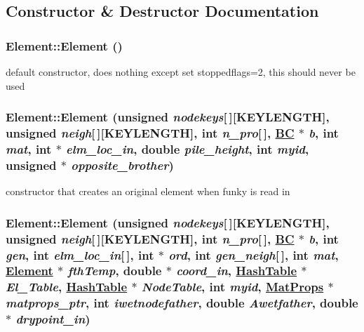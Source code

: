 \subsection{Constructor \& Destructor Documentation}
\hypertarget{classElement_a0}{
\subsubsection[Element]{\setlength{\rightskip}{0pt plus 5cm}Element::Element ()}}
\label{classElement_a0}


default constructor, does nothing except set stoppedflags=2, this should never be used 

\hypertarget{classElement_a1}{
\subsubsection[Element]{\setlength{\rightskip}{0pt plus 5cm}Element::Element (unsigned {\em nodekeys}\mbox{[}$\,$\mbox{]}\mbox{[}KEYLENGTH\mbox{]}, unsigned {\em neigh}\mbox{[}$\,$\mbox{]}\mbox{[}KEYLENGTH\mbox{]}, int {\em n\_\-pro}\mbox{[}$\,$\mbox{]}, \hyperlink{structBC}{BC} $\ast$ {\em b}, int {\em mat}, int $\ast$ {\em elm\_\-loc\_\-in}, double {\em pile\_\-height}, int {\em myid}, unsigned $\ast$ {\em opposite\_\-brother})}}
\label{classElement_a1}


constructor that creates an original element when funky is read in 

\hypertarget{classElement_a2}{
\subsubsection[Element]{\setlength{\rightskip}{0pt plus 5cm}Element::Element (unsigned {\em nodekeys}\mbox{[}$\,$\mbox{]}\mbox{[}KEYLENGTH\mbox{]}, unsigned {\em neigh}\mbox{[}$\,$\mbox{]}\mbox{[}KEYLENGTH\mbox{]}, int {\em n\_\-pro}\mbox{[}$\,$\mbox{]}, \hyperlink{structBC}{BC} $\ast$ {\em b}, int {\em gen}, int {\em elm\_\-loc\_\-in}\mbox{[}$\,$\mbox{]}, int $\ast$ {\em ord}, int {\em gen\_\-neigh}\mbox{[}$\,$\mbox{]}, int {\em mat}, \hyperlink{classElement}{Element} $\ast$ {\em fth\-Temp}, double $\ast$ {\em coord\_\-in}, \hyperlink{classHashTable}{Hash\-Table} $\ast$ {\em El\_\-Table}, \hyperlink{classHashTable}{Hash\-Table} $\ast$ {\em Node\-Table}, int {\em myid}, \hyperlink{structMatProps}{Mat\-Props} $\ast$ {\em matprops\_\-ptr}, int {\em iwetnodefather}, double {\em Awetfather}, double $\ast$ {\em drypoint\_\-in})}}
\label{classElement_a2}


